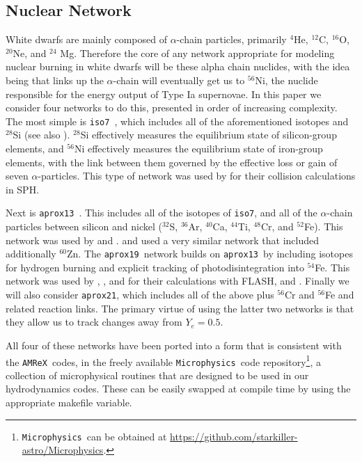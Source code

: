 \documentclass[twocolumn,numberedappendix]{../aastex6}
\newcommand{\amrex}{\texttt{AMReX}}
\newcommand{\microphysics}{\texttt{Microphysics}}
\newcommand{\isoseven}{\texttt{iso7}}
\newcommand{\aproxthirteen}{\texttt{aprox13}}
\newcommand{\aproxnineteen}{\texttt{aprox19}}
\newcommand{\aproxtwentyone}{\texttt{aprox21}}
\begin{document}
\subsection{Nuclear Network}
\label{sec:network}

White dwarfs are mainly composed of $\alpha$-chain particles, primarily ${}^4$He,
${}^{12}$C, ${}^{16}$O, ${}^{20}$Ne, and ${}^{24}$ Mg. Therefore the core of
any network appropriate for modeling nuclear burning in white dwarfs will be
these alpha chain nuclides, with the idea being that links up the $\alpha$-chain
will eventually get us to ${}^{56}$Ni, the nuclide responsible for the
energy output of Type Ia supernovae. In this paper we consider four networks
to do this, presented in order of increasing complexity. The most simple is
\isoseven\ \citep{timmes:2000}, which includes all of the aforementioned isotopes and
${}^{28}$Si (see also \citet{hix:1998}). ${}^{28}$Si effectively measures the
equilibrium state of silicon-group elements, and ${}^{56}$Ni effectively measures
the equilibrium state of iron-group elements, with the link between them governed
by the effective loss or gain of seven $\alpha$-particles. This type of network
was used by \citet{rosswog:2009} for their collision calculations in SPH.

Next is \aproxthirteen\ \citep{timmes:1999,timmes:2000}. This includes
all of the isotopes of \isoseven, and all of the $\alpha$-chain particles between
silicon and nickel (${}^{32}$S, ${}^{36}$Ar, ${}^{40}$Ca, ${}^{44}$Ti, ${}^{48}$Cr,
and ${}^{52}$Fe). This network was used by \citet{hawley:2012} and \citet{raskin:2010}.
\citet{loren-aguilar:2010} and \citet{garcia-senz:2013} used a very similar network
that included additionally ${}^{60}$Zn. The \aproxnineteen\ network \citep{timmes:1999}
builds on \aproxthirteen\ by including isotopes for hydrogen burning and explicit
tracking of photodisintegration into ${}^{54}$Fe. This network was used by
\citet{kushnir:2013}, \citet{kushnir:2014}, and \citet{rosswog:2009} for their
calculations with FLASH, and \citet{papish:2015}. Finally we will also
consider \aproxtwentyone, which includes all of the above plus ${}^{56}$Cr
and ${}^{56}$Fe and related reaction links. The primary virtue of using
the latter two networks is that they allow us to track changes away from
$Y_e = 0.5$.

All four of these networks have been ported into a form that is consistent
with the \amrex\ codes, in the freely available \microphysics\ code
repository\footnote{\microphysics\ can be obtained at \url{https://github.com/starkiller-astro/Microphysics}.},
a collection of microphysical routines that are designed to be used in our
hydrodynamics codes. These can be easily swapped at compile time by using the 
appropriate makefile variable.
\end{document}
